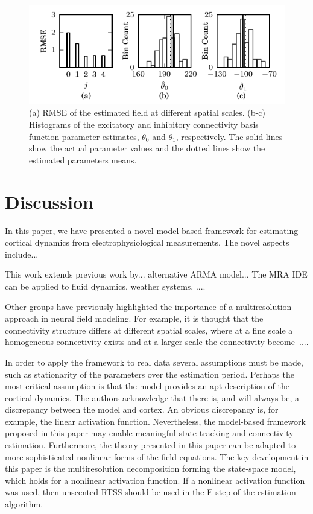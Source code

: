 \documentclass[journal,a4paper]{IEEEtran}
\begin{document}
\begin{figure}[!h] 
 \centering
 \includegraphics[scale=1]{./Graph/Hist.pdf}
 \caption{(a) RMSE of the estimated field at different spatial scales. (b-c) Histograms of the excitatory and inhibitory connectivity basis function parameter estimates, $\theta_0$ and $\theta_1$, respectively. The solid lines show the actual parameter values and the dotted lines show the estimated parameters means.}
 \label{fig:ParametersHistogram}
 \end{figure} 

\section{Discussion}
In this paper, we have presented a novel model-based framework for estimating cortical dynamics from electrophysiological measurements. The novel aspects include...

This work extends previous work by... alternative ARMA model... The MRA IDE can be applied to fluid dynamics, weather systems, ....

Other groups have previously highlighted the importance of a multiresolution approach in neural field modeling. For example, it is thought that the connectivity structure differs at different spatial scales, where at a fine scale a homogeneous connectivity exists and at a larger scale the connectivity become~\cite{Qubbaj2009}....

In order to apply the framework to real data several assumptions must be made, such as stationarity of the parameters over the estimation period. Perhaps the most critical assumption is that the model provides an apt description of the cortical dynamics. The authors acknowledge that there is, and will always be, a discrepancy between the model and cortex. An obvious discrepancy is, for example, the linear activation function. Nevertheless, the model-based framework proposed in this paper may enable meaningful state tracking and connectivity estimation. Furthermore, the theory presented in this paper can be adapted to more sophisticated nonlinear forms of the field equations. The key development in this paper is the multiresolution decomposition forming the state-space model, which holds for a nonlinear activation function. If a nonlinear activation function was used, then unscented RTSS should be used in the E-step of the estimation algorithm. 
\end{document}
